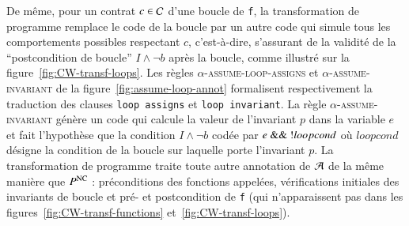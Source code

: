 De même, pour un contrat $c\in{\ensuremath\mathcal{C}}$ d'une boucle de \lstinline'f', la
transformation de programme remplace le code de la boucle par un autre code qui
simule tous les comportements possibles respectant $c$, c'est-à-dire, s'assurant
de la validité de la ``postcondition de boucle'' $I \land \lnot b$ après la
boucle, comme illustré sur la figure~\ref{fig:CW-transf-loops}.
Les règles \textsc{$\alpha$-assume-loop-assigns} et
\textsc{$\alpha$-assume-invariant} de la figure~\ref{fig:assume-loop-annot}
formalisent respectivement la traduction des clauses \lstinline'loop assigns' et
\lstinline'loop invariant'.
La règle \textsc{$\alpha$-assume-invariant} génère un code qui calcule la valeur
de l'invariant $p$ dans la variable $e$ et fait l'hypothèse que la condition
$I \land \lnot b$ codée par $e~\mbox{\lstinline'\&\& !'}loopcond$ où $loopcond$
désigne la condition de la boucle sur laquelle porte l'invariant $p$.
La transformation de programme traite toute autre annotation de ${\mathcal{A}}$ de la
même manière que $P^{\mathrm{NC}}$ : préconditions des fonctions appelées, vérifications
initiales des invariants de boucle et pré- et postcondition de \lstinline'f'
(qui n'apparaissent pas dans les figures~\ref{fig:CW-transf-functions}
et~\ref{fig:CW-transf-loops}).


\begin{figure}[tb]
  \begin{minipage}{0.5\columnwidth}
    
  \end{minipage}
  \begin{minipage}{0.5\columnwidth}
    
  \end{minipage}
\end{figure}

